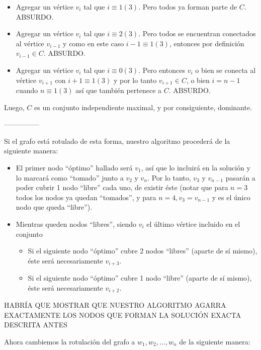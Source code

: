 \begin{itemize}
	\item Agregar un vértice $v_i$ tal que $i \equiv 1 (3)$.  Pero todos ya forman parte de $C$. ABSURDO.
	\item Agregar un vértice $v_i$ tal que $i \equiv 2 (3)$.  Pero todos se encuentran conectados al vértice $v_{i-1}$ y como en este caso $i-1 \equiv 1(3)$, entonces por definición $v_{i-1} \in C$. ABSURDO.
	\item Agregar un vértice $v_i$ tal que $i \equiv 0 (3)$.  Pero entonces $v_i$ o bien se conecta al vértice $v_{i+1}$ con $i+1 \equiv 1 (3)$ y por lo tanto $v_{i+1} \in C$, o bien $i = n-1$ cuando $n \equiv 1 (3)$ así que también pertenece a $C$. ABSURDO.
\end{itemize}

Luego, $C$ es un conjunto independiente maximal, y por consiguiente, dominante.

---------------

Si el grafo está rotulado de esta forma, nuestro algoritmo procederá de la siguiente manera:

\begin{itemize}
\item El primer nodo ``óptimo'' hallado será $v_1$, así que lo incluirá en la solución y lo marcará como ``tomado'' junto a $v_2$ y $v_n$. Por lo tanto, $v_3$ y $v_{n-1}$ pasarán a poder cubrir 1 nodo ``libre'' cada uno, de existir éste (notar que para $n = 3$ todos los nodos ya quedan ``tomados'', y para $n = 4, v_3 = v_{n-1}$ y es el único nodo que queda ``libre'').
\item Mientras queden nodos ``libres'', siendo $v_i$ el último vértice incluido en el conjunto

	\begin{itemize}
	\item Si el siguiente nodo ``óptimo'' cubre 2 nodos ``libres'' (aparte de sí mismo), éste será necesariamente $v_{i+3}$.
	\item Si el siguiente nodo ``óptimo'' cubre 1 nodo ``libre'' (aparte de sí mismo), éste será necesariamente $v_{i+2}$.
	\end{itemize}

\end{itemize}

HABRÍA QUE MOSTRAR QUE NUESTRO ALGORITMO AGARRA EXACTAMENTE LOS NODOS QUE FORMAN LA SOLUCIÓN EXACTA DESCRITA ANTES

Ahora cambiemos la rotulación del grafo a $w_1,w_2,...,w_n$ de la siguiente manera:

